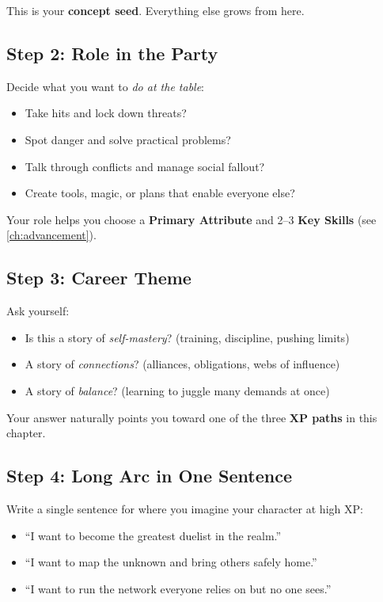This is your \textbf{concept seed}. Everything else grows from here.

\subsection*{Step 2: Role in the Party}
\label{sec:xp-role-party}

Decide what you want to \emph{do at the table}:
\begin{itemize}
  \item Take hits and lock down threats?
  \item Spot danger and solve practical problems?
  \item Talk through conflicts and manage social fallout?
  \item Create tools, magic, or plans that enable everyone else?
\end{itemize}

Your role helps you choose a \textbf{Primary Attribute} and 2--3 \textbf{Key Skills}
(see \ref{ch:advancement}).

\subsection*{Step 3: Career Theme}
\label{sec:xp-career-theme}

Ask yourself:
\begin{itemize}
  \item Is this a story of \emph{self-mastery}? (training, discipline, pushing limits)
  \item A story of \emph{connections}? (alliances, obligations, webs of influence)
  \item A story of \emph{balance}? (learning to juggle many demands at once)
\end{itemize}

Your answer naturally points you toward one of the three \textbf{XP paths} in
this chapter.

\subsection*{Step 4: Long Arc in One Sentence}
\label{sec:xp-long-arc}

Write a single sentence for where you imagine your character at high XP:
\begin{itemize}
  \item ``I want to become the greatest duelist in the realm.''
  \item ``I want to map the unknown and bring others safely home.''
  \item ``I want to run the network everyone relies on but no one sees.''
\end{itemize}

